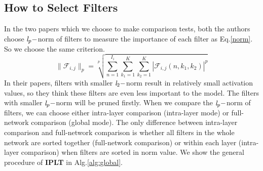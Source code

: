 \documentclass[runningheads]{llncs}
\begin{document}
\subsection{How to Select Filters}
In the two papers which we choose to make comparison tests, both the authors choose $\emph{l}_p-$norm of filters to measure the importance of each filter as Eq.\ref{norm}. So we choose the same criterion.
\begin{equation}
    \|\mathcal{F}_{i,j}\|_p = \sqrt[p]{\sum_{n=1}^{I_i} \sum_{k_1=1}^K \sum_{k_2=1}^K |\mathcal{F}_{i,j}(n,k_1,k_2)|^p}
\label{norm}
\end{equation}
In their papers, filters with smaller $\emph{l}_2-$norm result in relatively small activation values, so they think these filters are even less important to the model. The filters with smaller $\emph{l}_p-$norm will be pruned firstly. When we compare the $\emph{l}_p-$norm of filters, we can choose either intra-layer comparison (intra-layer mode) or full-network comparison (global mode). The only difference between intra-layer comparison and full-network comparison is whether all filters in the whole network are sorted together (full-network comparison) or within each layer (intra-layer comparison) when filters are sorted in norm value. We show the general procedure of \textbf{IPLT} in Alg.\ref{alg:global}.

\end{document}
